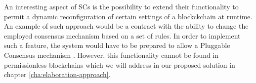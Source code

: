 An interesting aspect of \gls{SC}s is the possibility to extend their functionality to permit a dynamic reconfiguration of certain settings of a blockckchain at runtime. An example of such approach would be a contract with the ability to change the employed consensus mechanism based on a set of rules. In order to implement such a feature, the system would have to be prepared to allow a Pluggable Consensus mechanism \cite{dynamic_reconfiguration_consensus_IoT, research_self_adaptive_consensus}. However, this functionality cannot be found in permissionless blockchains which we will address in our proposed solution in chapter \ref{cha:elaboration-approach}.



